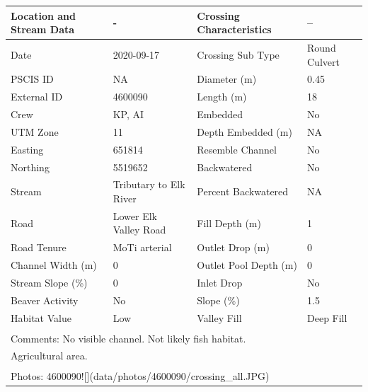 \documentclass[
]{book}
\begin{document}
\begin{tabular}{l|l|l|l}
\hline
Location and Stream Data & - & Crossing Characteristics & --\\
\hline
Date & 2020-09-17 & Crossing Sub Type & Round Culvert\\
\hline
PSCIS ID & NA & Diameter (m) & 0.45\\
\hline
External ID & 4600090 & Length (m) & 18\\
\hline
Crew & KP, AI & Embedded & No\\
\hline
UTM Zone & 11 & Depth Embedded (m) & NA\\
\hline
Easting & 651814 & Resemble Channel & No\\
\hline
Northing & 5519652 & Backwatered & No\\
\hline
Stream & Tributary to Elk River & Percent Backwatered & NA\\
\hline
Road & Lower Elk Valley Road & Fill Depth (m) & 1\\
\hline
Road Tenure & MoTi arterial & Outlet Drop (m) & 0\\
\hline
Channel Width (m) & 0 & Outlet Pool Depth (m) & 0\\
\hline
Stream Slope (\%) & 0 & Inlet Drop & No\\
\hline
Beaver Activity & No & Slope (\%) & 1.5\\
\hline
Habitat Value & Low & Valley Fill & Deep Fill\\
\hline
\multicolumn{4}{l}{\textsuperscript{} Comments: No visible channel. Not likely fish habitat.}\\
\multicolumn{4}{l}{Agricultural area.}\\
\multicolumn{4}{l}{\textsuperscript{} Photos: 4600090![](data/photos/4600090/crossing\_all.JPG)}\\
\end{tabular}
\end{document}
